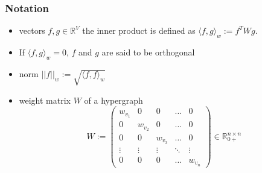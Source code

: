 \documentclass{beamer}
\begin{document}
	\begin{frame}
	
	\frametitle{Notation}
	\begin{itemize}
		
		
		
		
		\item  vectors $f, g \in \mathbb{R}^V$ the inner product is defined as $ \langle f,g \rangle_w := f^T W g$.
		\item 	If $ \langle f,g \rangle_w   = 0 $, $f$ and $g$ are said to be orthogonal
		\item  norm  $||f||_w := \sqrt{ \langle f,f \rangle_w}$
		\item  weight matrix $W$ of a hypergraph \begin{equation}
		W := 
		\begin{pmatrix}
		w_{v_1} & 0 & 0&\dots &0 \\
		0 & w_{v_2} & 0 & \ldots & 0 \\
		0 & 0 & w_{v_3} & \ldots & 0 \\
		\vdots & \vdots & \vdots & \ddots & \vdots \\
		0 &0&0& \ldots  & w_{v_n}
		\end{pmatrix} \in \mathbb{R}_{0+}^{n \times n} 
		\end{equation} 
	\end{itemize}
\end{frame}
\end{document}
